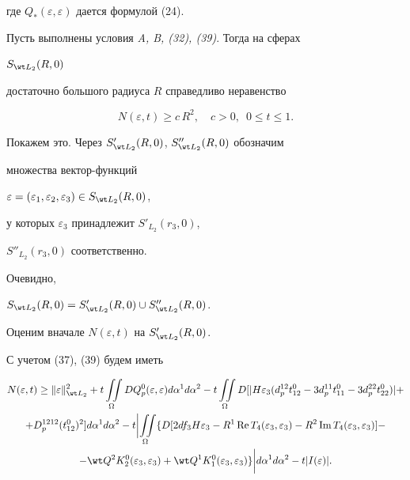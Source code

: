 где $Q_*(\varepsilon,\varepsilon)$ дается формулой (24). 


 


\begin{thm} 


Пусть выполнены условия {\em A, B, (32), (39)}. Тогда на сферах 


$S_{\wt L_2}(R,0)$ 


достаточно большого радиуса $R$ справедливо неравенство 


$$ 


N(\varepsilon,t)\ge c\,R^2,\quad 


c>0,\ \; 0\le t\le 1. 


$$ 


\end{thm} 


 


Покажем это. Через $S'_{\wt L_2}(R,0)$, $S''_{\wt L_2}(R,0)$ обозначим 


множества вектор-функций 


$\varepsilon=(\varepsilon_1,\varepsilon_2,\varepsilon_3)\in 


S_{\wt L_2}(R,0)$, 


у которых $\varepsilon_3$ принадлежит $S'_{L_2}(r_3,0)$, 


$S''_{L_2}(r_3,0)$ соответственно. 


Очевидно, 


$S_{\wt L_2}(R,0)=S'_{\wt L_2}(R,0)\cup S''_{\wt L_2}(R,0)$. 


Оценим вначале $N(\varepsilon,t)$ на $S'_{\wt L_2}(R,0)$. 


С учетом (37), (39) будем иметь 


\begin{multline} 


N(\varepsilon,t)\ge\|\varepsilon\|^2_{\wt L_2}+ 


t\intO DQ^0_p(\varepsilon,\varepsilon)d\alpha^1d\alpha^2- 


t\intO D[|H\varepsilon_3(d^{12}_p t^0_{12}- 


3d^{11}_p t^0_{11}-3d^{22}_p t^0_{22})|+ \\ 


%


+D^{1212}_p(t^0_{12})^2]d\alpha^1d\alpha^2- 


t\biggl|\intO\{D[2df_3H\varepsilon_3- 


R^1\re T_4(\varepsilon_3,\varepsilon_3)-R^2\im T_4 


(\varepsilon_3,\varepsilon_3)]\biggr.- \\ 


%


-\biggl.\wt Q^2K^0_2(\varepsilon_3,\varepsilon_3)+ 


\wt Q^1K^0_1(\varepsilon_3,\varepsilon_3)\}\biggr| 


d\alpha^1d\alpha^2-t| I(\varepsilon)|. 


\end{multline} 


